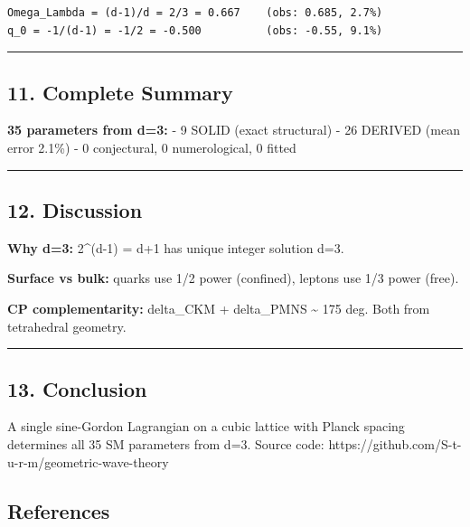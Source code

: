 \documentclass[
]{article}
\begin{document}
\begin{verbatim}
Omega_Lambda = (d-1)/d = 2/3 = 0.667    (obs: 0.685, 2.7%)
q_0 = -1/(d-1) = -1/2 = -0.500          (obs: -0.55, 9.1%)
\end{verbatim}

\begin{center}\rule{0.5\linewidth}{0.5pt}\end{center}

\subsection{11. Complete Summary}\label{complete-summary}

\textbf{35 parameters from d=3:} - 9 SOLID (exact structural) - 26
DERIVED (mean error 2.1\%) - 0 conjectural, 0 numerological, 0 fitted

\begin{center}\rule{0.5\linewidth}{0.5pt}\end{center}

\subsection{12. Discussion}\label{discussion}

\textbf{Why d=3:} 2\^{}(d-1) = d+1 has unique integer solution d=3.

\textbf{Surface vs bulk:} quarks use 1/2 power (confined), leptons use
1/3 power (free).

\textbf{CP complementarity:} delta\_CKM + delta\_PMNS \textasciitilde{}
175 deg. Both from tetrahedral geometry.

\begin{center}\rule{0.5\linewidth}{0.5pt}\end{center}

\subsection{13. Conclusion}\label{conclusion}

A single sine-Gordon Lagrangian on a cubic lattice with Planck spacing
determines all 35 SM parameters from d=3. Source code:
https://github.com/S-t-u-r-m/geometric-wave-theory

\subsection{References}\label{references}
\end{document}
